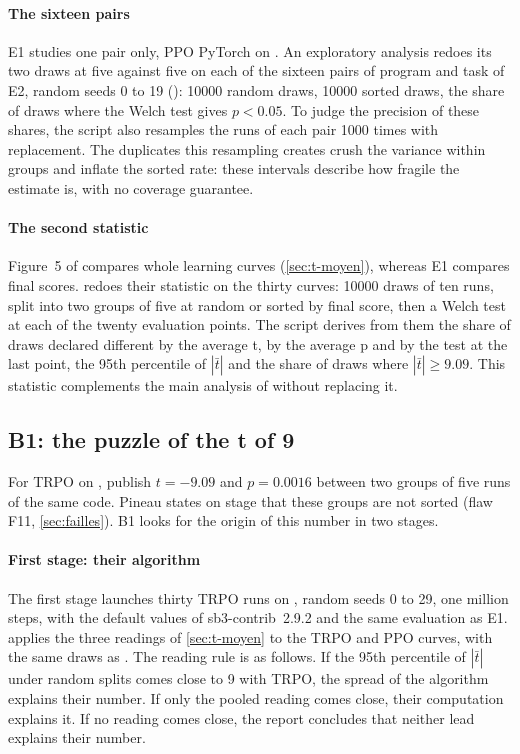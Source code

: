 \paragraph{The sixteen pairs}
E1 studies one pair only, PPO PyTorch on . An exploratory analysis redoes its two draws at five against five on each of the sixteen pairs of program and task of
E2, random seeds 0 to 19 (): \num{10000} random draws, \num{10000} sorted
draws, the share of draws where the Welch test gives $p<0.05$. To judge the precision of these shares, the
script also resamples the runs of each pair \num{1000} times with replacement. The duplicates this resampling
creates crush the variance within groups and inflate the sorted rate: these intervals describe how fragile the
estimate is, with no coverage guarantee.

\paragraph{The second statistic}
Figure~5 of \textcite{henderson2018matters} compares whole learning curves (\cref{sec:t-moyen}), whereas E1
compares final scores.
 redoes their statistic on the thirty curves: \num{10000} draws of ten runs,
split into two groups of five at random or sorted by final score, then a Welch test at each of the twenty
evaluation points. The script derives from them the share of draws declared different by the average t, by the average p and by
the test at the last point, the 95th percentile of $|\bar t|$ and the share of draws where
$|\bar t|\ge 9.09$. This statistic complements the main analysis of  without replacing it.

\subsection{B1: the puzzle of the t of 9}\label{sec:plan-b1}
For TRPO on , \textcite{henderson2018matters} publish $t=-9.09$ and $p=0.0016$ between two
groups of five runs of the same code. Pineau states on stage that these groups are not sorted (flaw F11, \cref{sec:failles}). B1 looks for the
origin of this number in two stages.

\paragraph{First stage: their algorithm}
The first stage launches thirty TRPO runs on
, random seeds 0 to 29, one million steps, with the default values of sb3-contrib~2.9.2
and the same evaluation as E1.  applies the three readings of
\cref{sec:t-moyen} to the TRPO and PPO curves, with the same draws as . The reading rule
is as follows. If the 95th percentile of $|\bar t|$ under random splits comes close to 9 with TRPO, the
spread of the algorithm explains their number. If only the pooled reading comes close, their computation
explains it. If no reading comes close, the report concludes that neither lead explains their number.

